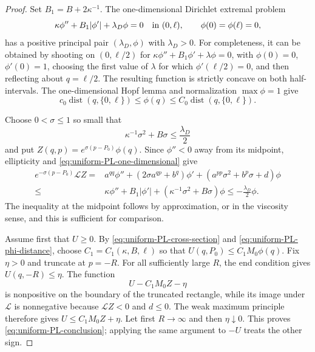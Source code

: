 \documentclass[11pt,reqno]{amsart}
\numberwithin{equation}{section}
\theoremstyle{definition}
\theoremstyle{remark}
\begin{document}
\begin{proof}
Set $B_1=B+2\kappa^{-1}$.  The one-dimensional Dirichlet
extremal problem
\begin{equation}\label{eq:uniform-PL-one-dimensional}
 \kappa\phi''+B_1|\phi'|+\lambda_D\phi=0
 \quad\hbox{in }(0,\ell),
 \qquad \phi(0)=\phi(\ell)=0,
\end{equation}
has a positive principal pair $(\lambda_D,\phi)$ with
$\lambda_D>0$.  For completeness, it can be obtained by shooting
on $(0,\ell/2)$ for
$\kappa\phi''+B_1\phi'+\lambda\phi=0$, with
$\phi(0)=0$, $\phi'(0)=1$, choosing the first value of $\lambda$
for which $\phi'(\ell/2)=0$, and then reflecting about
$q=\ell/2$.  The resulting function is strictly concave on both
half-intervals.  The one-dimensional Hopf lemma and normalization
$\max\phi=1$ give
\begin{equation}\label{eq:uniform-PL-phi-distance}
 c_0\operatorname{dist}(q,\{0,\ell\})
 \le\phi(q)\le
 C_0\operatorname{dist}(q,\{0,\ell\}).
\end{equation}

Choose $0<\sigma\le1$ so small that
\begin{equation}\label{eq:uniform-PL-sigma-choice}
 \kappa^{-1}\sigma^2+B\sigma\le\frac{\lambda_D}{2}
\end{equation}
and put $Z(q,p)=e^{\sigma(p-P_0)}\phi(q)$.  Since
$\phi''<0$ away from its midpoint, ellipticity and
\eqref{eq:uniform-PL-one-dimensional} give
\[
 \begin{aligned}
 e^{-\sigma(p-P_0)}\mathscr LZ
 ={}&a^{qq}\phi''+(2\sigma a^{qp}+b^q)\phi'
 +(a^{pp}\sigma^2+b^p\sigma+d)\phi\\
 \le{}&\kappa\phi''+B_1|\phi'|
 +(\kappa^{-1}\sigma^2+B\sigma)\phi
 \le-\frac{\lambda_D}{2}\phi.
 \end{aligned}
\]
The inequality at the midpoint follows by approximation, or in the
viscosity sense, and this is sufficient for comparison.

Assume first that $U\ge0$.  By
\eqref{eq:uniform-PL-cross-section} and
\eqref{eq:uniform-PL-phi-distance}, choose
$C_1=C_1(\kappa,B,\ell)$ so that
$U(q,P_0)\le C_1M_0\phi(q)$.  Fix $\eta>0$ and truncate at
$p=-R$.  For all sufficiently large $R$, the end condition gives
$U(q,-R)\le\eta$.  The function
\[
 U-C_1M_0Z-\eta
\]
is nonpositive on the boundary of the truncated rectangle, while
its image under $\mathscr L$ is nonnegative because
$\mathscr LZ<0$ and $d\le0$.  The weak maximum principle therefore
gives $U\le C_1M_0Z+\eta$.  Let first $R\to\infty$ and then
$\eta\downarrow0$.  This proves
\eqref{eq:uniform-PL-conclusion}; applying the same argument to
$-U$ treats the other sign.
\end{proof}
\end{document}
